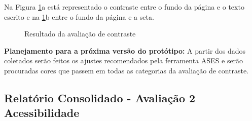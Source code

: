 Na Figura \ref{fig:contraste1b}a está representado o contraste entre o fundo da página e o texto escrito e na \ref{fig:contraste1b}b entre o fundo da página e a seta.
\begin{figure}[h!]
  \centering
    \caption{Resultado da avaliação de contraste}
    \label{fig:contraste1b}
\end{figure}

\textbf{Planejamento para a próxima versão do protótipo:}
A partir dos dados coletados serão feitos os ajustes recomendados pela ferramenta ASES e serão procuradas cores que passem em todas
as categorias da avaliação de contraste.

\vfill
\pagebreak


\subsection{Relatório Consolidado - Avaliação 2 Acessibilidade}

